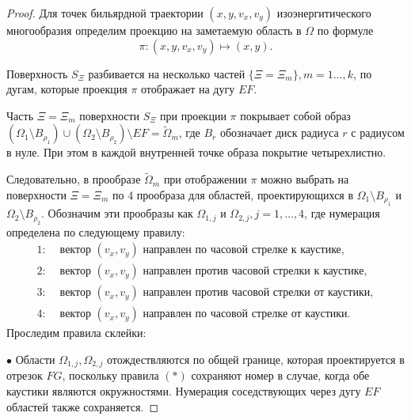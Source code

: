 \begin{proof}
Для точек бильярдной траектории $(x, y, v_x, v_y)$ изоэнергитического многообразия определим проекцию на заметаемую область в $\Omega$ по формуле
$$\pi : (x, y, v_x, v_y) \mapsto (x,y).$$

Поверхность $S_\Xi$ разбивается на несколько частей $\{\Xi = \Xi_m\}, m = 1 \ldots, k$, по дугам, которые проекция $\pi$ отображает на дугу $EF$. 

Часть $\Xi = \Xi_m$ поверхности $S_\Xi$ при проекции $\pi$ покрывает собой образ $(\Omega_1 \setminus B_{\rho_1}) \cup (\Omega_2 \setminus B_{\rho_2}) \setminus EF = \widetilde{\Omega}_m$, где $B_r$ обозначает диск радиуса $r$ с радиусом в нуле. При этом в каждой внутренней точке образа покрытие четырехлистно.

Следовательно, в прообразе  $\widetilde{\Omega}_m$ при отображении $\pi$ можно выбрать на поверхности $\Xi = \Xi_m$ по 4 прообраза для областей, проектирующихся в $\Omega_1 \setminus B_{\rho_1}$ и $\Omega_2 \setminus B_{\rho_2}$. Обозначим  эти прообразы как $\Omega_{1, j}$ и $\Omega_{2,j}, j=1, \ldots, 4$, где нумерация определена по следующему правилу:
\begin{equation}
\begin{array}{ll}
1: & \text{ вектор } (v_x, v_y) \text{ направлен по часовой стрелке к каустике}, \\
2: & \text{ вектор } (v_x, v_y) \text{ направлен против часовой стрелки к каустике}, \\
3: & \text{ вектор } (v_x, v_y) \text{ направлен против часовой стрелки от каустики}, \\
4: & \text{ вектор } (v_x, v_y) \text{ направлен по часовой стрелке от каустики}.
\end{array}
\label{eq:foc_numeration_circle}
\end{equation}
Проследим правила склейки:

$\bullet$ Области $\Omega_{1, j}, \Omega_{2, j}$ отождествляются по общей границе, которая проектируется в отрезок $FG$, поскольку правила $(\ast)$ сохраняют номер в случае, когда обе каустики являются окружностями. Нумерация соседствующих через дугу $EF$ областей также сохраняется.


\end{proof}
